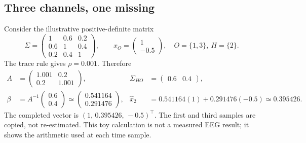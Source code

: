\documentclass[11pt,a4paper]{article}
\begin{document}
\subsection{Three channels, one missing}
Consider the illustrative positive-definite matrix
\begin{equation}
 \Sigma=\begin{pmatrix}1&0.6&0.2\\0.6&1&0.4\\0.2&0.4&1\end{pmatrix},
 \qquad x_O=\begin{pmatrix}1\\-0.5\end{pmatrix},\quad O=\{1,3\},\ H=\{2\}.
\end{equation}
The trace rule gives $\rho=0.001$. Therefore
\begin{align}
 A&=\begin{pmatrix}1.001&0.2\\0.2&1.001\end{pmatrix},&
 \Sigma_{HO}&=\begin{pmatrix}0.6&0.4\end{pmatrix},\\
 \beta&=A^{-1}\begin{pmatrix}0.6\\0.4\end{pmatrix}
       \simeq\begin{pmatrix}0.541164\\0.291476\end{pmatrix},&
 \widehat x_2&=0.541164(1)+0.291476(-0.5)\simeq0.395426.
\end{align}
The completed vector is $(1,\,0.395426,\,-0.5)^\top$. The first and third
samples are copied, not re-estimated. This toy calculation is not a measured
EEG result; it shows the arithmetic used at each time sample.

\begin{center}
\end{center}
\end{document}
